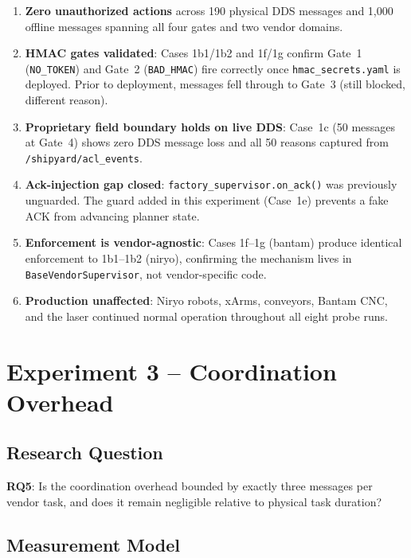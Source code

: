 \documentclass[11pt,a4paper]{article}
\begin{document}
\begin{enumerate}
  \item \textbf{Zero unauthorized actions} across 190 physical DDS messages
    and 1{,}000 offline messages spanning all four gates and two vendor
    domains.
  \item \textbf{HMAC gates validated}: Cases 1b1/1b2 and 1f/1g confirm
    Gate~1 (\texttt{NO\_TOKEN}) and Gate~2 (\texttt{BAD\_HMAC}) fire
    correctly once \texttt{hmac\_secrets.yaml} is deployed.
    Prior to deployment, messages fell through to Gate~3 (still blocked,
    different reason).
  \item \textbf{Proprietary field boundary holds on live DDS}: Case~1c
    (50 messages at Gate~4) shows zero DDS message loss and all 50 reasons
    captured from \texttt{/shipyard/acl\_events}.
  \item \textbf{Ack-injection gap closed}: \texttt{factory\_supervisor.on\_ack()}
    was previously unguarded.  The guard added in this experiment (Case~1e)
    prevents a fake ACK from advancing planner state.
  \item \textbf{Enforcement is vendor-agnostic}: Cases 1f--1g (bantam) produce
    identical enforcement to 1b1--1b2 (niryo), confirming the mechanism
    lives in \texttt{BaseVendorSupervisor}, not vendor-specific code.
  \item \textbf{Production unaffected}: Niryo robots, xArms, conveyors,
    Bantam CNC, and the laser continued normal operation throughout all
    eight probe runs.
\end{enumerate}

\section{Experiment 3 -- Coordination Overhead}

\subsection{Research Question}

\textbf{RQ5}: Is the coordination overhead bounded by exactly three messages
per vendor task, and does it remain negligible relative to physical task
duration?

\subsection{Measurement Model}
\end{document}
